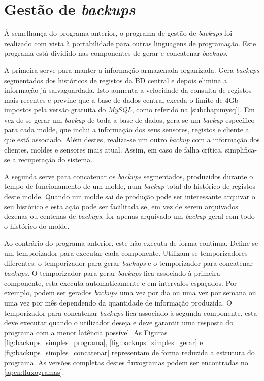 \documentclass[11pt,twoside,a4paper]{report}
\begin{document}
\section{Gestão de \textit{backups}}
\label{subchap:backups}
À semelhança do programa anterior, o programa de gestão de \textit{backups} foi realizado com vista à portabilidade para outras linguagens de programação. Este programa está dividido nas componentes de gerar e concatenar \textit{backups}.\par 
A primeira serve para manter a informação armazenada organizada. Gera \textit{backups} segmentados dos históricos de registos da BD central e depois elimina a informação já salvaguardada. Isto aumenta a velocidade da consulta de registos mais recentes e previne que a base de dados central exceda o limite de 4Gb impostos pela versão gratuita do \textit{MySQL}, como referido na \autoref{subchap:mysql}. Em vez de se gerar um \textit{backup} de toda a base de dados, gera-se um \textit{backup} específico para cada molde, que inclui a informação dos seus sensores, registos e cliente a que está associado. Além destes, realiza-se um outro \textit{backup} com a informação dos clientes, moldes e sensores mais atual. Assim, em caso de falha crítica, simplifica-se a recuperação do sistema.\par 
A segunda serve para concatenar os \textit{backups} segmentados, produzidos durante o tempo de funcionamento de um molde, num \textit{backup} total do histórico de registos deste molde. Quando um molde sai de produção pode ser interessante arquivar o seu histórico e esta ação pode ser facilitada se, em vez de serem arquivados dezenas ou centenas de \textit{backups}, for apenas arquivado um \textit{backup} geral com todo o histórico do molde.\par 
Ao contrário do programa anterior, este não executa de forma contínua. Define-se um temporizador para executar cada componente. Utilizam-se temporizadores diferentes: o temporizador para gerar \textit{backups} e o temporizador para concatenar \textit{backups}. O temporizador para gerar \textit{backups} fica associado à primeira componente, esta executa automaticamente e em intervalos espaçados. Por exemplo, podem ser gerados \textit{backups} uma vez por dia ou uma vez por semana ou uma vez por mês dependendo da quantidade de informação produzida. O temporizador para concatenar \textit{backups} fica associado à segunda componente, esta deve executar quando o utilizador deseja e deve garantir uma resposta do programa com a menor latência possível.
As Figuras \ref{fig:backups_simples_programa}, \ref{fig:backups_simples_gerar} e \ref{fig:backups_simples_concatenar} representam de forma reduzida a estrutura do programa. As versões completas destes fluxogramas podem ser encontradas no \autoref{apen:fluxogramas}.\par 
\end{document}
